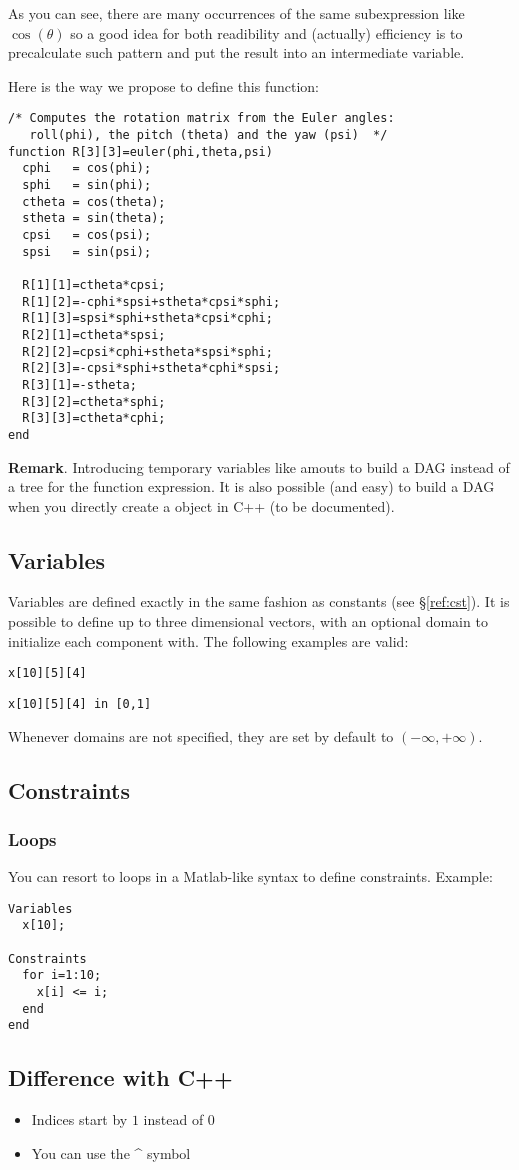 As you can see, there are many occurrences of the same subexpression
like $\cos(\theta)$ so a good idea for both readibility and (actually) efficiency
is to precalculate such pattern and put the result into an intermediate variable.

Here is the way we propose to define this function:

\begin{verbatim}
/* Computes the rotation matrix from the Euler angles: 
   roll(phi), the pitch (theta) and the yaw (psi)  */
function R[3][3]=euler(phi,theta,psi)
  cphi   = cos(phi);
  sphi   = sin(phi);
  ctheta = cos(theta);
  stheta = sin(theta);
  cpsi   = cos(psi);
  spsi   = sin(psi);
  
  R[1][1]=ctheta*cpsi;
  R[1][2]=-cphi*spsi+stheta*cpsi*sphi;  
  R[1][3]=spsi*sphi+stheta*cpsi*cphi;
  R[2][1]=ctheta*spsi;    
  R[2][2]=cpsi*cphi+stheta*spsi*sphi;   
  R[2][3]=-cpsi*sphi+stheta*cphi*spsi;
  R[3][1]=-stheta;        
  R[3][2]=ctheta*sphi;                  
  R[3][3]=ctheta*cphi;
end
\end{verbatim}

{\bf Remark}. Introducing temporary variables like  amouts to build a DAG instead of
a tree for the function expression. It is also possible (and easy) to build a DAG when you directly create
a  object in C++ (to be documented).

\subsection{Variables}

Variables are defined exactly in the same fashion as constants (see \S\ref{ref:cst}).
It is possible to define up to three dimensional vectors, with an optional domain to initialize each
component with. The following examples are valid:

{\tt x[10][5][4]}

{\tt x[10][5][4] in [0,1]}

Whenever domains are not specified, they are set by default to $(-\infty,+\infty)$.

\subsection{Constraints}
\subsubsection{Loops}

You can resort to loops in a Matlab-like syntax to define constraints. Example:

\begin{verbatim}
Variables
  x[10];

Constraints
  for i=1:10;
    x[i] <= i;
  end
end
\end{verbatim}

\subsection{Difference with C++}

\begin{itemize}
\item Indices start by $1$ instead of $0$
\item You can use the \^{} symbol
\end{itemize}

